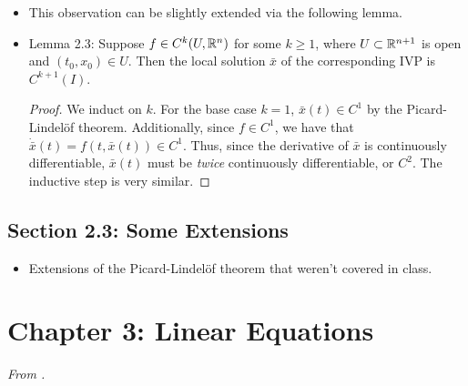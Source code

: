 \documentclass[../notes.tex]{subfiles}
\begin{document}
\begin{itemize}
\begin{itemize}
    \end{itemize}
    \item This observation can be slightly extended via the following lemma.
    \item Lemma 2.3: Suppose $f\in C^k(U,\mathbb{R}^n)$ for some $k\geq 1$, where $U\subset\mathbb{R}^{n+1}$ is open and $(t_0,x_0)\in U$. Then the local solution $\bar{x}$ of the corresponding IVP is $C^{k+1}(I)$.
    \begin{proof}
        We induct on $k$. For the base case $k=1$, $\bar{x}(t)\in C^1$ by the Picard-Lindel\"{o}f theorem. Additionally, since $f\in C^1$, we have that $\dot{\bar{x}}(t)=f(t,\bar{x}(t))\in C^1$. Thus, since the derivative of $\bar{x}$ is continuously differentiable, $\bar{x}(t)$ must be \emph{twice} continuously differentiable, or $C^2$. The inductive step is very similar.
    \end{proof}
\end{itemize}


\subsection*{Section 2.3: Some Extensions}
\begin{itemize}
    \item Extensions of the Picard-Lindel\"{o}f theorem that weren't covered in class.
\end{itemize}



\section{Chapter 3: Linear Equations}
\emph{From \textcite{bib:Teschl}.}
\end{document}
